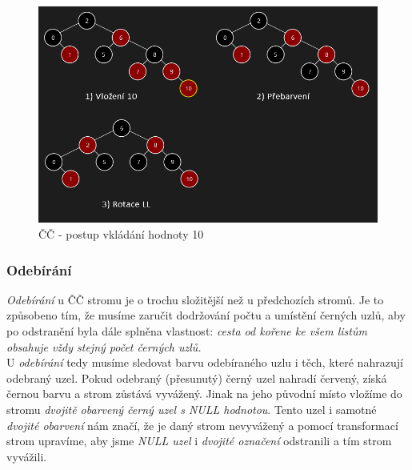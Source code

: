 \documentclass[
  biblatex=false,
  font=serif,
  glossaries=false,
  tables=false,
  theorems=false,
  index
]{kidiplom}
\begin{document}
\begin{figure}[h!]
\centering
	\includegraphics[scale=0.57]{obrazky/24CCVlozeni.png}
	\caption{ČČ - postup vkládání hodnoty 10}
\end{figure}

\subsubsection{Odebírání}
\indent\indent \textit{Odebírání} u ČČ stromu je o trochu složitější než u předchozích stromů. Je to způsobeno tím, že musíme zaručit dodržování počtu a umístění černých uzlů, aby po odstranění byla dále splněna vlastnost: \textit{cesta od kořene ke všem listům obsahuje vždy stejný počet černých uzlů.}\\
\indent U \textit{odebírání} tedy musíme sledovat barvu odebíraného uzlu i těch, které nahrazují odebraný uzel. Pokud odebraný (přesunutý) černý uzel nahradí červený, získá černou barvu a strom zůstává vyvážený. Jinak na jeho původní místo vložíme do stromu \textit{dvojitě obarvený černý uzel s NULL hodnotou}. Tento uzel i samotné \textit{dvojité obarvení} nám značí, že je daný strom nevyvážený a pomocí transformací strom upravíme, aby jsme \textit{NULL uzel} i \textit{dvojité označení} odstranili a tím strom vyvážili.\\
\end{document}
